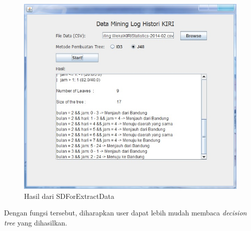 \begin{figure}[H]
\centering
\includegraphics[scale=0.7]{Gambar/percobaan3.jpg}
\caption[Hasil dari SDForExtractData]{Hasil dari SDForExtractData} 
\label{fig:percobaan3}
\end{figure}

Dengan fungsi tersebut, diharapkan user dapat lebih mudah membaca \textsl{decision tree} yang dihasilkan.















